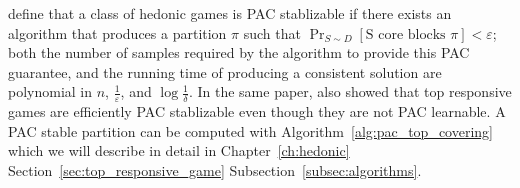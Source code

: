  define that a class of hedonic games is PAC stablizable if there exists an algorithm that produces a partition $\pi$ such that $\Pr_{S\sim D}[\text{S core blocks } \pi] < \varepsilon$; both the number of samples required by the algorithm to provide this PAC guarantee, and the running time of producing a consistent solution are polynomial in $n$, $\frac{1}{\varepsilon}$, and $\log{\frac{1}{\delta}}$. In the same paper,  also showed that top responsive games are efficiently PAC stablizable even though they are not PAC learnable.
A PAC stable partition can be computed with Algorithm~\ref{alg:pac_top_covering} which we will describe in detail in Chapter~\ref{ch:hedonic} Section~\ref{sec:top_responsive_game} Subsection~\ref{subsec:algorithms}.
